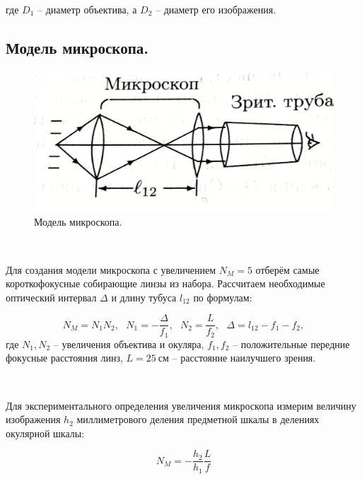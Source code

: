 \documentclass[a4paper, 12pt, twoside]{article}
\begin{document}
	где $D_1$ -- диаметр объектива, а $D_2$ -- диаметр его изображения.
	
	\subsection{Модель микроскопа.}
	
\begin{minipage}{0.25\linewidth}
	\begin{figure}[H]
		\centering
		\includegraphics[width =  \textwidth]{img4}
		\caption{Модель микроскопа.}
		\label{img4}
	\end{figure}
\end{minipage}
~
\begin{minipage}{0.74\linewidth}
	Для создания модели микроскопа с увеличением $N_M = 5$ отберём самые короткофокусные собирающие линзы из набора. Рассчитаем необходимые оптический интервал $\Delta$ и длину тубуса $l_{12}$ по формулам:
	
	\begin{equation}
	\label{mictheor}
	N_M = N_1 N_2, ~~~ N_1 = -\dfrac{\Delta}{f_1}, ~~~ N_2 = \dfrac{L}{f_2}, ~~~ \Delta = l_{12} - f_1 - f_2,
	\end{equation}
	где $N_1, N_2$ -- увеличения объектива и окуляра, $f_1, f_2$ -- положительные передние фокусные расстояния линз, $L = 25~\text{см}$ -- расстояние наилучшего зрения.
\end{minipage}

~

Для экспериментального определения увеличения микроскопа измерим величину изображения $h_2$ миллиметрового деления предметной шкалы в делениях окулярной шкалы:

\begin{equation}
\label{mic}
N_M = -\dfrac{h_2}{h_1}\dfrac{L}{f}
\end{equation} 

\newpage
\end{document}
